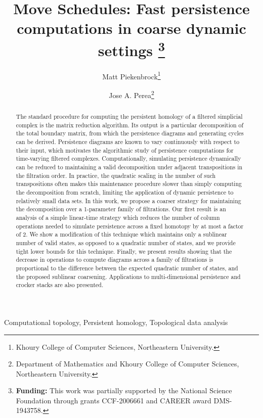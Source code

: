 \documentclass{article} %
\title{
	Move Schedules: Fast persistence computations in coarse dynamic settings
	\thanks{
	\textbf{Funding:} This work was partially supported by the National Science Foundation through grants CCF-2006661 and CAREER award DMS-1943758.
	}
}
\author{
	Matt Piekenbrock\thanks{Khoury College of Computer Sciences, Northeastern University.}
	\and Jose A. Perea\thanks{
	Department of Mathematics and Khoury College of Computer Sciences, Northeastern University.}
}
\begin{document}
 

\maketitle

\begin{abstract}
	The standard procedure for computing the persistent homology of a filtered simplicial complex is the matrix reduction algorithm. Its output is a particular decomposition of the total boundary matrix, from which the persistence diagrams and generating cycles can be derived. 
	Persistence diagrams are known to vary continuously with respect to their input, which motivates the algorithmic study of persistence computations for time-varying filtered complexes. Computationally, simulating persistence dynamically can be reduced to maintaining a valid decomposition under adjacent transpositions in the filtration order. 
	In practice, the quadratic scaling in the number of  such transpositions often makes this maintenance procedure slower than simply computing the decomposition from scratch,  limiting the application of dynamic persistence to relatively small data sets. In this work, we propose a coarser strategy for maintaining the decomposition over a 1-parameter family of filtrations. Our first result is an analysis of a simple linear-time strategy which reduces the number of column operations needed to simulate persistence across a fixed homotopy by at most a factor of 2. We show a modification of this technique which maintains only a sublinear number of valid states, as opposed to a quadratic number of states, and we provide tight lower bounds for this technique.
	Finally, we present results showing that the decrease in operations to compute diagrams across a family of filtrations is proportional to the difference between the expected quadratic number of states, and the proposed sublinear coarsening.
	Applications to multi-dimensional persistence and crocker stacks are also presented.
\end{abstract}

\begin{keywords}
  {Computational topology, Persistent homology, Topological data analysis}
\end{keywords}
\end{document}
